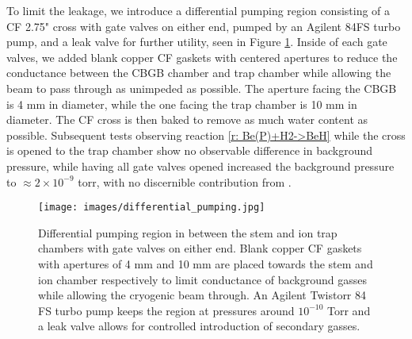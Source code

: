 To limit the leakage, we introduce a differential pumping region consisting of a CF 2.75" cross with gate valves on either end, pumped by an Agilent 84FS turbo pump, and a leak valve for further utility, seen in Figure \ref{fig: differential pumping}. Inside of each gate valves, we added blank copper CF gaskets with centered apertures to reduce the conductance between the CBGB chamber and trap chamber while allowing the beam to pass through as unimpeded as possible. The aperture facing the CBGB is 4 mm in diameter, while the one facing the trap chamber is 10 mm in diameter. The CF cross is then baked to remove as much water content as possible. Subsequent tests observing reaction \ref{r: Be(P)+H2->BeH} while the cross is opened to the trap chamber show no observable difference in background pressure, while having all gate valves opened increased the background pressure to $\approx 2 \times 10^{-9}$ torr, with no discernible contribution from .

\begin{figure}
	\centering
	\texttt{[image: images/differential\_pumping.jpg]}
	\caption{Differential pumping region in between the stem and ion trap chambers with gate valves on either end. Blank copper CF gaskets with apertures of 4 mm and 10 mm are placed towards the stem and ion chamber respectively to limit conductance of background gasses while allowing the cryogenic beam through. An Agilent Twistorr 84 FS turbo pump keeps the region at pressures around $10^{-10}$ Torr and a leak valve allows for controlled introduction of secondary gasses.}
	\label{fig: differential pumping}
\end{figure}